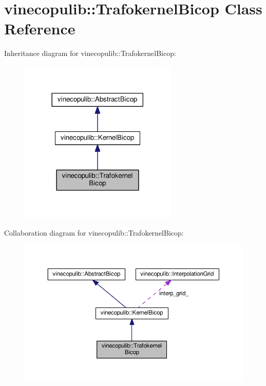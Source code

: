\hypertarget{classvinecopulib_1_1_trafokernel_bicop}{}\section{vinecopulib\+:\+:Trafokernel\+Bicop Class Reference}
\label{classvinecopulib_1_1_trafokernel_bicop}


Inheritance diagram for vinecopulib\+:\+:Trafokernel\+Bicop\+:\nopagebreak
\begin{figure}[H]
\begin{center}
\leavevmode
\includegraphics[width=213pt]{classvinecopulib_1_1_trafokernel_bicop__inherit__graph}
\end{center}
\end{figure}


Collaboration diagram for vinecopulib\+:\+:Trafokernel\+Bicop\+:\nopagebreak
\begin{figure}[H]
\begin{center}
\leavevmode
\includegraphics[width=350pt]{classvinecopulib_1_1_trafokernel_bicop__coll__graph}
\end{center}
\end{figure}

